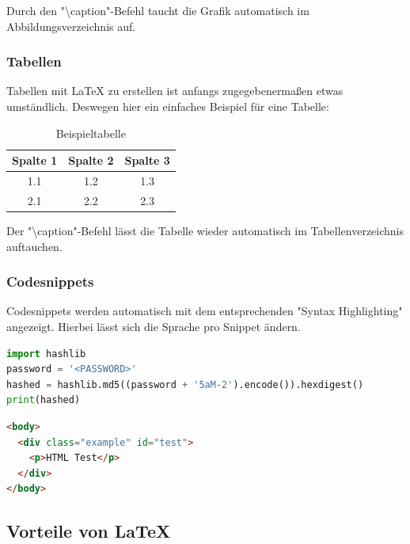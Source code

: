 Durch den "\textbackslash{}caption"-Befehl taucht die Grafik automatisch im Abbildungsverzeichnis auf.

\subsubsection{Tabellen}

Tabellen mit \LaTeX{} zu erstellen ist anfangs zugegebenermaßen etwas umständlich. Deswegen hier ein einfaches
Beispiel für eine Tabelle:


\begin{table}[H]
  \centering
  \begin{tabular}{|c|c|c|}
    \hline
    Spalte 1 & Spalte 2 & Spalte 3 \\
    \hline
    1.1 & 1.2 & 1.3 \\
    2.1 & 2.2 & 2.3 \\
    \hline
  \end{tabular}
  \caption{Beispieltabelle}
  \label{tab: Beispieltabelle}
\end{table}

Der "\textbackslash{}caption"-Befehl lässt die Tabelle wieder automatisch im Tabellenverzeichnis auftauchen.

\subsubsection{Codesnippets}

Codesnippets werden automatisch mit dem entsprechenden "Syntax Highlighting" angezeigt.
Hierbei lässt sich die Sprache pro Snippet ändern.
\vspace{.5cm}

\begin{lstlisting}[language=Python,caption=MD5-Hash-Generierung in Python]
import hashlib
password = '<PASSWORD>'
hashed = hashlib.md5((password + '5aM-2').encode()).hexdigest()
print(hashed)
\end{lstlisting}

\begin{lstlisting}[language=HTML,caption=HTML-Beispiel]
<body>
  <div class="example" id="test">
    <p>HTML Test</p>
  </div>
</body>
\end{lstlisting}

\subsection{Vorteile von \LaTeX}

